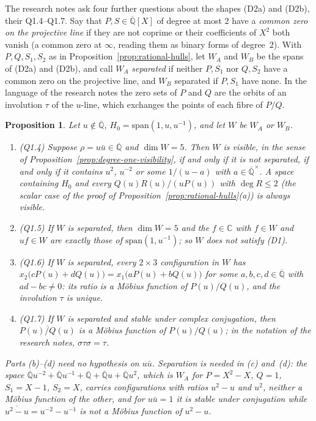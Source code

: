 \documentclass[11pt,a4paper]{article}
\theoremstyle{plain}
\newtheorem{proposition}[theorem]{Proposition}
\theoremstyle{definition}
\newcommand{\C}{\mathbb{C}}
\newcommand{\Alg}{\overline{\mathbb{Q}}}
\begin{document}
The research notes ask four further questions about the shapes (D2a) and (D2b), their Q1.4--Q1.7. Say that
$P,S\in\Alg[X]$ of degree at most $2$ have a \emph{common zero on the projective line} if they are not coprime or
their coefficients of $X^{2}$ both vanish (a common zero at $\infty$, reading them as binary forms of degree~$2$).
With $P,Q,S_{1},S_{2}$ as in Proposition~\ref{prop:rational-hulls}, let $W_{A}$ and $W_{B}$ be the spans of (D2a)
and (D2b), and call $W_{A}$ \emph{separated} if neither $P,S_{1}$ nor $Q,S_{2}$ have a common zero on the projective
line, and $W_{B}$ separated if $P,S_{1}$ have none. In the language of the research notes the zero sets of $P$ and
$Q$ are the orbits of an involution $\tau$ of the $u$-line, which exchanges the points of each fibre of $P/Q$.

\begin{proposition}\label{prop:invisible-degree-two}
Let $u\notin\Alg$, $H_{0}=\mathrm{span}(1,u,u^{-1})$, and let $W$ be $W_{A}$ or $W_{B}$.
\begin{enumerate}[label=\textup{(\alph*)}]
\item \textup{(Q1.4)} Suppose $\rho=u\bar u\in\Alg$ and $\dim W=5$. Then $W$ is visible, in the sense of
Proposition~\ref{prop:degree-one-visibility}, if and only if it is not separated, if and only if it contains $u^{2}$,
$u^{-2}$ or some $1/(u-a)$ with $a\in\Alg^{\times}$. A space containing $H_{0}$ and every $Q(u)R(u)/(uP(u))$ with
$\deg R\le2$ (the scalar case of the proof of Proposition~\ref{prop:rational-hulls}(a)) is always visible.
\item \textup{(Q1.5)} If $W$ is separated, then $\dim W=5$ and the $f\in\C$ with $f\in W$ and $uf\in W$ are exactly
those of $\mathrm{span}(1,u^{-1})$; so $W$ does not satisfy (D1).
\item \textup{(Q1.6)} If $W$ is separated, every $2\times3$ configuration in $W$ has
$x_{2}\bigl(cP(u)+dQ(u)\bigr)=x_{1}\bigl(aP(u)+bQ(u)\bigr)$ for some $a,b,c,d\in\Alg$ with $ad-bc\neq0$: its ratio is
a M\"obius function of $P(u)/Q(u)$, and the involution $\tau$ is unique.
\item \textup{(Q1.7)} If $W$ is separated and stable under complex conjugation, then $\overline{P(u)/Q(u)}$ is a
M\"obius function of $P(u)/Q(u)$; in the notation of the research notes, $\sigma\tau\sigma=\tau$.
\end{enumerate}
Parts (b)--(d) need no hypothesis on $u\bar u$. Separation is needed in (c) and~(d): the space
$\Alg u^{-2}+\Alg u^{-1}+\Alg+\Alg u+\Alg u^{2}$, which is $W_{A}$ for $P=X^{2}-X$, $Q=1$, $S_{1}=X-1$, $S_{2}=X$, carries
configurations with ratios $u^{2}-u$ and $u^{2}$, neither a M\"obius function of the other, and for $u\bar u=1$ it is
stable under conjugation while $\overline{u^{2}-u}=u^{-2}-u^{-1}$ is not a M\"obius function of $u^{2}-u$.
\end{proposition}
\end{document}
